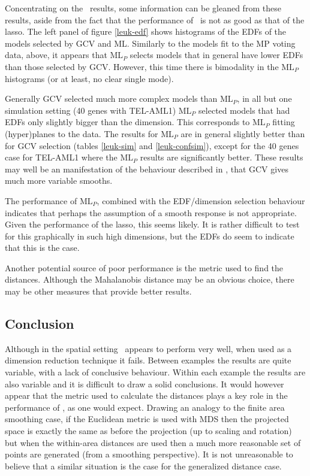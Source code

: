 Concentrating on the \mdsds\ results, some information can be gleaned from these results, aside from the fact that the performance of \mdsds\  is not as good as that of the lasso. The left panel of figure \ref{leuk-edf} shows histograms of the EDFs of the models selected by GCV and ML. Similarly to the models fit to the MP voting data, above, it appears that $\text{ML}_P$ selects models that in general have lower EDFs than those selected by GCV. However, this time there is bimodality in the $\text{ML}_P$ histograms (or at least, no clear single mode). 

Generally GCV selected much more complex models than $\text{ML}_P$, in all but one simulation setting (40 genes with TEL-AML1) $\text{ML}_P$ selected models that had EDFs only slightly bigger than the dimension. This corresponds to $\text{ML}_P$ fitting (hyper)planes to the data. The results for $\text{ML}_P$ are in general slightly better than for GCV selection (tables \ref{leuk-sim} and \ref{leuk-confsim}), except for the 40 genes case for TEL-AML1 where the $\text{ML}_P$ results are significantly better. These results may well be an manifestation of the behaviour described in , that GCV gives much more variable smooths. 

The performance of $\text{ML}_P$, combined with the EDF/dimension selection behaviour indicates that perhaps the assumption of a smooth response is not appropriate. Given the performance of the lasso, this seems likely. It is rather difficult to test for this graphically in such high dimensions, but the EDFs do seem to indicate that this is the case.

Another potential source of poor performance is the metric used to find the distances. Although the Mahalanobis distance may be an obvious choice, there may be other measures that provide better results.


\subsection{Conclusion}

Although in the spatial setting \mdsds\ appears to perform very well, when used as a dimension reduction technique it fails. Between examples the results are quite variable, with a lack of conclusive behaviour. Within each example the results are also variable and it is difficult to draw a solid conclusions. It would however appear that the metric used to calculate the distances plays a key role in the performance of \mdsds, as one would expect. Drawing an analogy to the finite area smoothing case, if the Euclidean metric is used with MDS then the projected space is exactly the same as before the projection (up to scaling and rotation) but when the within-area distances are used then a much more reasonable set of points are generated (from a smoothing perspective). It is not unreasonable to believe that a similar situation is the case for the generalized distance case.

